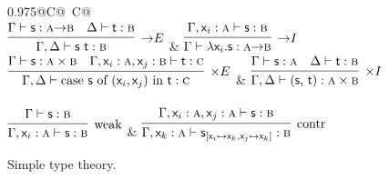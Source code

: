 \begin{figure}
	\centering
	\begin{tabularx}{0.975\textwidth}{@{}C@{~}C@{}}
		\\[2em]
		$\infer[\ii E]{\Gamma, \Delta \vdash \term{s~t} : \prop b}{\Gamma \vdash \term{s} : \prop{a} \ii \prop{b} & \Delta \vdash \term{t} : \prop{b}}$ 
		& 
		$\infer[\ii I]{\Gamma \vdash \term{\lam \vari .s} : \prop a \ii \prop{b}}{\Gamma, \term{\vari }: \prop{a} \vdash \term{s}:\prop{b}}$\\[2em]
		$\infer[\times E]
			{\Gamma,\Delta \vdash
			\caseof{s}{(\vari,\varj)}{t}: \prop{c}}
			{\Gamma \vdash \term{s}: \prop{a} \times \prop{b} & 
			\Gamma, \term{\vari }: \prop{a} , \term{\varj}: \prop{b} \vdash \term{t}: \prop{c}}$ 
		&
		$\infer[\times I]
			{\Gamma, \Delta \vdash \cterm{(\term{s}, \term{t})}: \prop{a} \times \prop{b}}
			{\Gamma \vdash \term{s}: \prop{a} & \Delta \vdash \term{t}:\prop{b}}$\\[\smallsep]
		\\[2em]
		$\infer[\Weakening{}]
			{\Gamma, \term{\vari }: \prop{a} \vdash \term{s}: \prop{b}}
			{\Gamma \vdash \term{s}:\prop{b}} $ 
		&
		$\infer[\Contraction{}]
			{\Gamma, \term{\vark}: \prop{a} \vdash \term{s}_{[\term{\vari } \mapsto \term{\vark}, \term{\varj} \mapsto \term{\vark}]}:\prop{b}}
			{\Gamma,  \term{\vari }: \prop{a}, \term{\varj}: \prop{a} \vdash \term{s}: \prop{b}}$
		\end{tabularx}
	\caption{Simple type theory.}
	\label{figure:simple_type_theory}
\end{figure}

